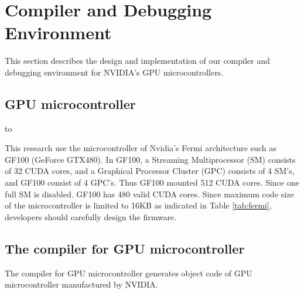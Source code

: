 
\section{Compiler and Debugging Environment}\label{sec:design}

This section describes the design and implementation of our compiler and
debugging environment for NVIDIA's GPU microcontrollers.

\subsection{GPU microcontroller}

\begin{table}[tb]
\caption{Microcontroller Specifications in GF100 } 
\label{tab:fermi}
\hbox to
\end{table}

This research use the microcontroller of Nvidia's Fermi architecture such as GF100 (GeForce GTX480).
In GF100, a Streaming Multiprocessor (SM) consists of 32 CUDA cores, and a Graphical Processor Cluster (GPC) consists of 4 SM's, and GF100 consist of 4 GPC's. Thus GF100 mounted 512 CUDA cores. Since one full SM is disabled. GF100 has 480 valid CUDA cores.
Since maximum code size of the microcontroller is limited to 16KB as indicated in Table \ref{tab:fermi}, developers should carefully design the firmware.

\subsection{The compiler for GPU microcontroller}
The compiler for GPU microcontroller generates object code of GPU microcontroller manufactured by NVIDIA.
